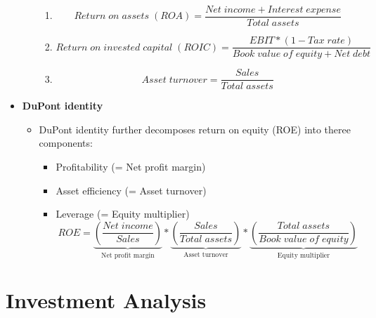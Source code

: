 \documentclass[ieeetran]{article}
\begin{document}
\begin{itemize}
\begin{itemize}
\begin{enumerate}
		    \item 
		    \large
		    \begin{equation*}
		    \boxed{Return \; on \; assets \; (ROA)=\frac{Net \; income + Interest \; expense}{Total \; assets}}
		    \end{equation*}
		    \normalsize

		    \item 
		    \large
		    \begin{equation*}
		    \boxed{Return \; on \; invested \; capital \; (ROIC)=\frac{EBIT *  (1-Tax \; rate)}{Book \; value \; of \; equity + Net \; debt}}
		    \end{equation*}
		    \normalsize		    

		    \item 
		    \large
		    \begin{equation*}
		    \boxed{Asset \; turnover = \frac{Sales}{Total \; assets}}
		    \end{equation*}
		    \normalsize
		  \end{enumerate}
	\end{itemize}
\item \textbf{DuPont identity}
	\begin{itemize}
	  \item DuPont identity further decomposes return on equity (ROE) into theree components:
		  \begin{itemize}
		    \item Profitability (= Net profit margin)
	            \item Asset efficiency (= Asset turnover)
		    \item Leverage (= Equity multiplier)
			    \large
			    \begin{equation*}
				    \boxed{ROE = \underbrace{(\frac{Net \; income}{Sales})}_\text{Net profit margin} * \underbrace{(\frac{Sales}{Total \; assets})}_\text{Asset turnover} * \underbrace{(\frac{Total \; assets}{Book \; value \; of \; equity})}_\text{Equity multiplier}}
			    \end{equation*}
			    \normalsize
			    
		  \end{itemize}
	\end{itemize}
\end{itemize}
	
\section{Investment Analysis} %
\label{sec:investment_analysis}
\end{document}
